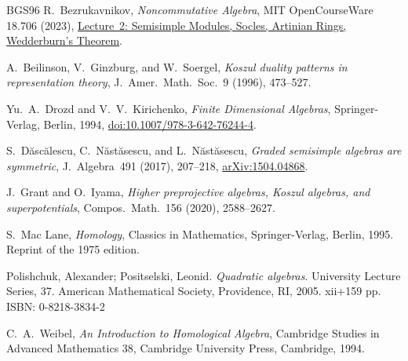 \documentclass[11pt,a4paper]{article}
\numberwithin{equation}{section}
\theoremstyle{all}
\theoremstyle{remark}
\begin{document}
\clearpage
\begin{thebibliography}{BGS96}
R.~Bezrukavnikov,
\emph{Noncommutative Algebra}, MIT OpenCourseWare 18.706 (2023),
\href{https://ocw.mit.edu/courses/18-706-noncommutative-algebra-spring-2023/resources/mit18_706_s23_lec02_pdf/}{Lecture~2: Semisimple Modules, Socles, Artinian Rings, Wedderburn's Theorem}.

A.~Beilinson, V.~Ginzburg, and W.~Soergel,
\emph{Koszul duality patterns in representation theory},
J.~Amer.~Math.~Soc.~9 (1996), 473--527.

Yu.~A.~Drozd and V.~V.~Kirichenko,
\emph{Finite Dimensional Algebras},
Springer-Verlag, Berlin, 1994,
\href{https://doi.org/10.1007/978-3-642-76244-4}{doi:10.1007/978-3-642-76244-4}.

S.~D\u{a}sc\u{a}lescu, C.~N\u{a}st\u{a}sescu, and L.~N\u{a}st\u{a}sescu,
\emph{Graded semisimple algebras are symmetric},
J.~Algebra~491 (2017), 207--218,
\href{https://arxiv.org/abs/1504.04868}{arXiv:1504.04868}.

J.~Grant and O.~Iyama,
\emph{Higher preprojective algebras, Koszul algebras, and superpotentials},
Compos.~Math.~156 (2020), 2588--2627.

S.~Mac Lane,
\emph{Homology},
Classics in Mathematics,
Springer-Verlag, Berlin, 1995. Reprint of the 1975 edition.

Polishchuk, Alexander; Positselski, Leonid. \emph{Quadratic algebras}. University Lecture Series, 37. American Mathematical Society, Providence, RI, 2005. xii+159 pp. ISBN: 0-8218-3834-2

C.~A.~Weibel,
\emph{An Introduction to Homological Algebra},
Cambridge Studies in Advanced Mathematics 38,
Cambridge University Press, Cambridge, 1994.
\end{thebibliography}
\end{document}
